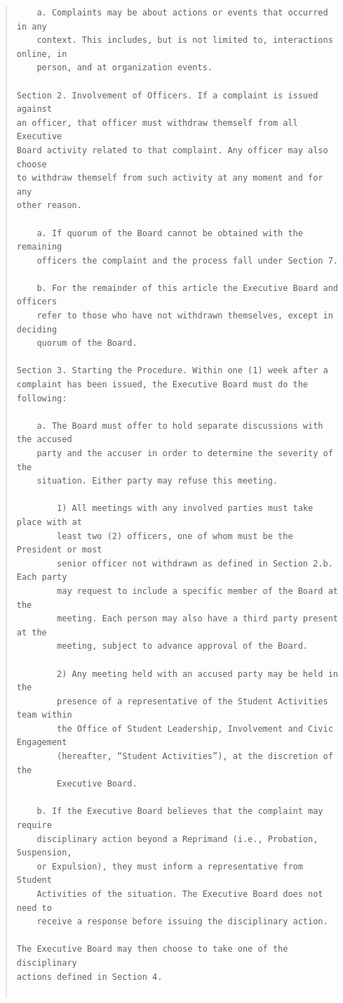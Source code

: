 \documentclass{article}
\begin{document}
\begin{quote}
\begin{verbatim}
    a. Complaints may be about actions or events that occurred in any
    context. This includes, but is not limited to, interactions online, in
    person, and at organization events.

Section 2. Involvement of Officers. If a complaint is issued against
an officer, that officer must withdraw themself from all Executive
Board activity related to that complaint. Any officer may also choose
to withdraw themself from such activity at any moment and for any
other reason.

    a. If quorum of the Board cannot be obtained with the remaining
    officers the complaint and the process fall under Section 7.

    b. For the remainder of this article the Executive Board and officers
    refer to those who have not withdrawn themselves, except in deciding
    quorum of the Board.

Section 3. Starting the Procedure. Within one (1) week after a
complaint has been issued, the Executive Board must do the following:

    a. The Board must offer to hold separate discussions with the accused
    party and the accuser in order to determine the severity of the
    situation. Either party may refuse this meeting.

        1) All meetings with any involved parties must take place with at
        least two (2) officers, one of whom must be the President or most
        senior officer not withdrawn as defined in Section 2.b. Each party
        may request to include a specific member of the Board at the
        meeting. Each person may also have a third party present at the
        meeting, subject to advance approval of the Board.

        2) Any meeting held with an accused party may be held in the
        presence of a representative of the Student Activities team within
        the Office of Student Leadership, Involvement and Civic Engagement
        (hereafter, “Student Activities”), at the discretion of the
        Executive Board.

    b. If the Executive Board believes that the complaint may require
    disciplinary action beyond a Reprimand (i.e., Probation, Suspension,
    or Expulsion), they must inform a representative from Student
    Activities of the situation. The Executive Board does not need to
    receive a response before issuing the disciplinary action.

The Executive Board may then choose to take one of the disciplinary
actions defined in Section 4.


\end{verbatim}
\end{quote}
\end{document}
